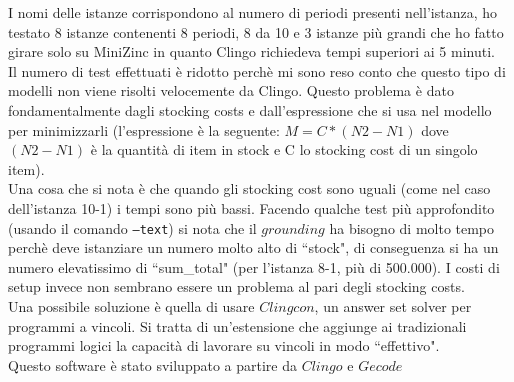 \documentclass[12pt]{article}
\begin{document}
\noindent I nomi delle istanze corrispondono al numero di periodi presenti nell'istanza, ho testato 8 istanze contenenti 8 periodi, 8 da 10 e 3 istanze più grandi che ho fatto girare solo su MiniZinc in quanto Clingo richiedeva tempi superiori ai 5 minuti.\\
Il numero di test effettuati è ridotto perchè mi sono reso conto che questo tipo di modelli non viene risolti velocemente da Clingo. Questo problema è dato fondamentalmente dagli stocking costs e dall'espressione che si usa nel modello per minimizzarli (l'espressione è la seguente: $M = C*(N2-N1)$ dove $(N2-N1)$ è la quantità di item in stock e C lo stocking cost di un singolo item).\\
Una cosa che si nota è che quando gli stocking cost sono uguali (come nel caso dell'istanza 10-1) i tempi sono più bassi. Facendo qualche test più approfondito (usando il comando \texttt{--text}) si nota che il $grounding$ ha bisogno di molto tempo perchè deve istanziare un numero molto alto di ``stock", di conseguenza si ha un numero elevatissimo di ``sum\_total" (per l'istanza 8-1, più di 500.000). I costi di setup invece non sembrano essere un problema al pari degli stocking costs.\\

\noindent Una possibile soluzione è quella di usare $Clingcon$, un answer set solver per programmi a vincoli. Si tratta di un'estensione che aggiunge ai tradizionali programmi logici la capacità di lavorare su vincoli in modo ``effettivo".\\
Questo software è stato sviluppato a partire da $Clingo$ e $Gecode$
\end{document}
